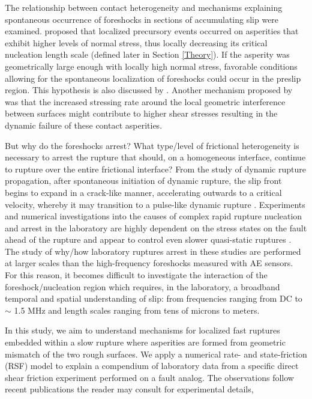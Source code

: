 \documentclass[preprint,1p, 10pt,authoryear]{elsarticle}
\begin{document}
The relationship between contact heterogeneity and mechanisms explaining spontaneous occurrence of foreshocks in sections of accumulating slip were examined.  \citet{Selvadurai2017} proposed that localized precursory events occurred on asperities that exhibit higher levels of normal stress, thus locally decreasing its critical nucleation length scale (defined later in Section \ref{Theory}). If the asperity was geometrically large enough with locally high normal stress, favorable conditions allowing for the spontaneous localization of foreshocks could occur in the preslip region. This hypothesis is also discussed by \citet{McLaskey2019}. Another mechanism proposed by \citet{McLaskey2013} was that the increased stressing rate around the local geometric interference between surfaces might contribute to higher shear stresses resulting in the dynamic failure of these contact asperities.  

But why do the foreshocks arrest? What type/level of frictional heterogeneity is necessary to arrest the rupture that should, on a homogeneous interface, continue to rupture over the entire frictional interface? From the study of dynamic rupture propagation, after spontaneous initiation of dynamic rupture, the slip front begins to expand in a crack-like manner, accelerating outwards to a critical velocity, whereby it may transition to a pulse-like dynamic rupture \citep{Heaton1990, Meier2016}. Experiments and numerical investigations into the causes of complex rapid rupture nucleation and arrest in the laboratory are highly dependent on the stress states on the fault ahead of the rupture \citep{Rubinstein2004, Rubinstein2006, Ben-David2010,Svetlizky2014,Fineberg2015, Maegawa2010, Tromborg2011, Kammer2012,Gabriel2012, Kammer2015} and appear to control even slower quasi-static ruptures \citep{Selvadurai2017a}. The study of why/how laboratory ruptures arrest in these studies are performed at larger scales than the high-frequency foreshocks measured with AE sensors. For this reason, it becomes difficult to investigate the interaction of the foreshock/nucleation region which requires, in the laboratory, a broadband temporal and spatial understanding of slip: from frequencies ranging from DC to $\sim$ 1.5 MHz and length scales ranging from tens of microns to meters. 

In this study, we aim to understand mechanisms for localized fast ruptures embedded within a slow rupture where asperities are formed from geometric mismatch of the two rough surfaces. We apply a numerical rate- and state-friction (RSF) model \citep{Dieterich1979,Ampuero2008, Rubin2005} to explain a compendium of laboratory data from a specific direct shear friction experiment performed on a fault analog. The observations follow recent publications the reader may consult for experimental details,
\end{document}
